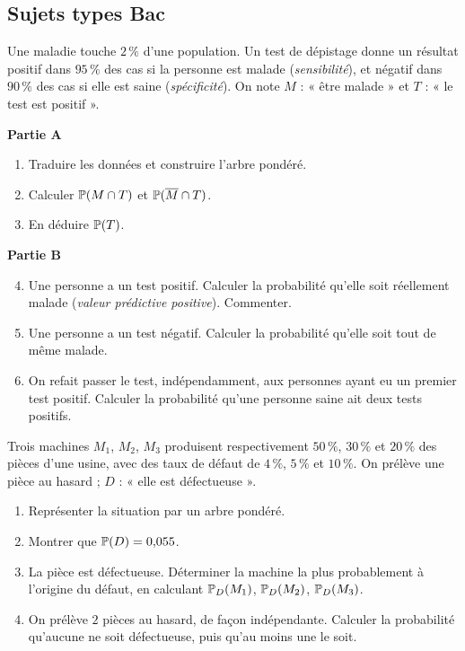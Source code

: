 \subsection{Sujets types Bac}

Une maladie touche $2\,\%$ d'une population. Un test de dépistage donne un
résultat positif dans $95\,\%$ des cas si la personne est malade
(\emph{sensibilité}), et négatif dans $90\,\%$ des cas si elle est saine
(\emph{spécificité}). On note $M$ : « être malade » et $T$ : « le test est
positif ».

\textbf{Partie A}
\begin{enumerate}
	\item Traduire les données et construire l'arbre pondéré.
	\item Calculer $\mathbb{P}(M\cap T)$ et $\mathbb{P}(\overline{M}\cap T)$.
	\item En déduire $\mathbb{P}(T)$.
\end{enumerate}

\textbf{Partie B}
\begin{enumerate}
	\setcounter{enumi}{3}
	\item Une personne a un test positif. Calculer la probabilité qu'elle soit
	réellement malade (\emph{valeur prédictive positive}). Commenter.
	\item Une personne a un test négatif. Calculer la probabilité qu'elle soit
	tout de même malade.
	\item On refait passer le test, indépendamment, aux personnes ayant eu un
	premier test positif. Calculer la probabilité qu'une personne saine ait
	deux tests positifs.
\end{enumerate}

Trois machines $M_1$, $M_2$, $M_3$ produisent respectivement $50\,\%$,
$30\,\%$ et $20\,\%$ des pièces d'une usine, avec des taux de défaut de
$4\,\%$, $5\,\%$ et $10\,\%$. On prélève une pièce au hasard ; $D$ : « elle
est défectueuse ».
\begin{enumerate}
	\item Représenter la situation par un arbre pondéré.
	\item Montrer que $\mathbb{P}(D)=0{,}055$.
	\item La pièce est défectueuse. Déterminer la machine la plus probablement
	à l'origine du défaut, en calculant $\mathbb{P}_D(M_1)$, $\mathbb{P}_D(M_2)$,
	$\mathbb{P}_D(M_3)$.
	\item On prélève $2$ pièces au hasard, de façon indépendante. Calculer la
	probabilité qu'aucune ne soit défectueuse, puis qu'au moins une le soit.
\end{enumerate}

